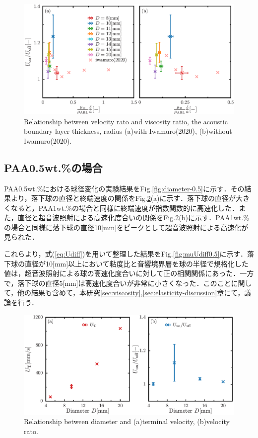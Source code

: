 \begin{figure}[ht]
    \centering
    \includegraphics[width=1\textwidth]{./5-Results/mu_Udiff.eps}
    \caption{Relationship between velocity rato and viscosity ratio, the acoustic boundary layer thickness, radius (a)with Iwamuro(2020), (b)without Iwamuro(2020).}
    \label{fig:muUdiff}
\end{figure}

\newpage

\subsection{PAA0.5wt.\%の場合}
PAA0.5wt.\%における球径変化の実験結果をFig.\ref{fig:diameter-0.5}に示す．その結果より，落下球の直径と終端速度の関係をFig.\ref{fig:diaUT0.5}(a)に示す．落下球の直径が大きくなると，PAA1wt.\%の場合と同様に終端速度が指数関数的に高速化した．また，直径と超音波照射による高速化度合いの関係をFig.\ref{fig:diaUT0.5}(b)に示す．PAA1wt.\%の場合と同様に落下球の直径10[mm]をピークとして超音波照射による高速化が見られた．

これらより，式(\ref{eq:Udiff})を用いて整理した結果をFig.\ref{fig:muUdiff0.5}に示す．落下球の直径が10[mm]以上において粘度比と音響境界層を球の半径で規格化した値は，超音波照射による球の高速化度合いに対して正の相関関係にあった．一方で，落下球の直径5[mm]は高速化度合いが非常に小さくなった．このことに関して，他の結果も含めて，本研究\ref{sec:viscosity},\ref{sec:elasticity-discussion}章にて，議論を行う．
\begin{figure}[ht]
    \centering
    \includegraphics[width=1\textwidth]{./5-Results/diameter-0.5/diaUT_Udiff.eps}
    \caption{Relationship between diameter and (a)terminal velocity, (b)velocity rato.}
    \label{fig:diaUT0.5}
\end{figure}


